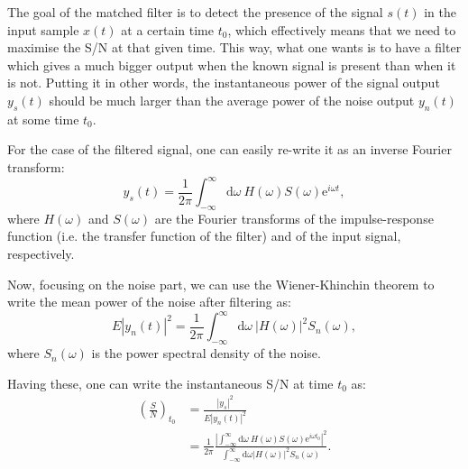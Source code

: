 The goal of the matched filter is to detect the presence of the signal $s(t)$ in the input sample $x(t)$ at a certain time $t_{0}$, which effectively means that we need to maximise the S/N at that given time. This way, what one wants is to have a filter which gives a much bigger output when the known signal is present than when it is not. Putting it in other words, the instantaneous power of the signal output $y_{s}(t)$ should be much larger than the average power of the noise output $y_{n}(t)$ at some time $t_{0}$.

For the case of the filtered signal, one can easily re-write it as an inverse Fourier transform:
\begin{equation}\label{2.4.3}
	y_{s}(t) = \frac{1}{2\pi} \int_{-\infty}^{\infty} \mathrm{d}\omega \ H(\omega) S(\omega) \mathrm{e}^{i \omega t},
\end{equation}
where $H(\omega)$ and $S(\omega)$ are the Fourier transforms of the impulse-response function (i.e. the transfer function of the filter) and of the input signal, respectively.

Now, focusing on the noise part, we can use the Wiener-Khinchin theorem \cite{Goodman1985} to write the mean power of the noise after filtering as:
\begin{equation}\label{2.4.4}
	E|y_{n}(t)|^{2} = \frac{1}{2\pi} \int_{-\infty}^{\infty} \mathrm{d}\omega \ |H(\omega)|^{2} S_{n}(\omega),
\end{equation}
where $S_{n}(\omega)$ is the power spectral density of the noise.

Having these, one can write the instantaneous S/N at time $t_{0}$ as:
\begin{equation}\label{2.4.5}
	\begin{split}
		\left(\frac{S}{N}\right)_{t_{0}} &= \frac{|y_{s}|^{2}}{E|y_{n}(t)|^{2}}\\
		&= \frac{1}{2\pi} \frac{\left|\int_{-\infty}^{\infty} \mathrm{d}\omega \ H(\omega) S(\omega) \mathrm{e}^{i \omega t_{0}}\right|^{2}}{\int_{-\infty}^{\infty} \mathrm{d}\omega \left|H(\omega)\right|^{2} S_{n}(\omega)}.
	\end{split}
\end{equation}

